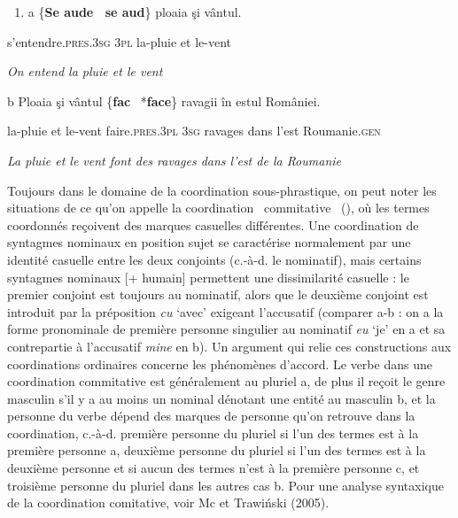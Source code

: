 \begin{enumerate}
\item \label{bkm:Ref300735120}a  \{\textbf{Se aude  {\textbar}~se aud}\}  ploaia  şi  vântul.


\end{enumerate}
s'entendre.\textsc{pres.3sg  {\textbar} 3pl}  la-pluie  et  le-vent

{\itshape
On entend la pluie et le vent}

  b  Ploaia  şi  vântul  \{\textbf{fac}  {\textbar}~*\textbf{face}\}  ravagii  în  estul  României.

    la-pluie  et  le-vent  faire.\textsc{pres.3pl  {\textbar} 3sg}  ravages  dans  l'est  Roumanie.\textsc{gen}

    \textit{La pluie et le vent font des ravages dans l'est de la Roumanie}

Toujours dans le domaine de la coordination sous-phrastique, on peut noter les situations de ce qu'on appelle la coordination {\guillemotleft}~commitative~{\guillemotright} (\citet{Haspelmath2007}), où les termes coordonnés reçoivent des marques casuelles différentes. Une coordination de syntagmes nominaux en position sujet se caractérise normalement par une identité casuelle entre les deux conjoints (c.-à-d. le nominatif), mais certains syntagmes nominaux [+ humain] permettent une dissimilarité casuelle : le premier conjoint est toujours au nominatif, alors que le deuxième conjoint est introduit par la préposition \textit{cu} `avec' exigeant l'accusatif (comparer a-b : on a la forme pronominale de première personne singulier au nominatif \textit{eu} `je' en a et sa contrepartie à l'accusatif \textit{mine} en b). Un argument qui relie ces constructions aux coordinations ordinaires concerne les phénomènes d'accord. Le verbe dans une coordination commitative est généralement au pluriel a, de plus il reçoit le genre masculin s'il y a au moins un nominal dénotant une entité au masculin b, et la personne du verbe dépend des marques de personne qu'on retrouve dans la coordination, c.-à-d. première personne du pluriel si l'un des termes est à la première personne a, deuxième personne du pluriel si l'un des termes est à la deuxième personne et si aucun des termes n'est à la première personne c, et troisième personne du pluriel dans les autres cas b. Pour une analyse syntaxique de la coordination comitative, voir Mc\citet{Nally1993} et Trawi\'nski (2005).  


